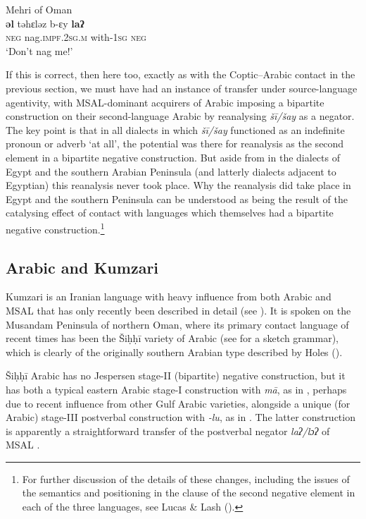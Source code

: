\documentclass[output=paper]{langsci/langscibook}
\begin{document}
\ea\label{ex:key:meh1}
{       Mehri of Oman \citep[23]{Johnstone1987}}\\
\gll \textbf{əl} təhɛləz b-ɛy \textbf{laʔ}\\
     \textsc{neg} nag.\textsc{impf.2sg.m} with-\textsc{1sg} \textsc{neg} \\
\glt ‘Don’t nag me!’
\z

If this is correct, then here too, exactly as with the Coptic–Arabic contact in the previous section, we must have had an instance of transfer under source-language agentivity, with MSAL-dominant acquirers of Arabic imposing a bipartite construction on their second-language Arabic by reanalysing \textit{šī/šay} as a negator. The key point is that in all dialects in which \textit{šī/šay} functioned as an indefinite pronoun or adverb ‘at all’, the potential was there for reanalysis as the second element in a bipartite negative construction. But aside from in the dialects of Egypt and the southern Arabian Peninsula (and latterly dialects adjacent to Egyptian) this reanalysis never took place. Why the reanalysis did take place in Egypt and the southern Peninsula can be understood as being the result of the catalysing effect of contact with languages which themselves had a bipartite negative construction.\footnote{For further discussion of the details of these changes, including the issues of the semantics and positioning in the clause of the second negative element in each of the three languages, see Lucas \& Lash (\citeyear[395–401]{LucasLash2010}).}



\subsection{Arabic and Kumzari}\label{sec:key:kumz}


Kumzari is an Iranian language with heavy influence from both Arabic and MSAL that has only recently been described in detail (see \citealt{WalAnonbyforthcoming}). It is spoken on the Musandam Peninsula of northern Oman, where its primary contact language of recent times has been the Šiḥḥī variety of Arabic (see \citealt{Bernabela2011} for a sketch grammar), which is clearly of the originally southern Arabian type described by Holes (\citeyear[18–32]{Holes2016}).

Šiḥḥī Arabic has no Jespersen stage-II (bipartite) negative construction, but it has both a typical eastern Arabic stage-I construction with \textit{mā}, as in , perhaps due to recent influence from other Gulf Arabic varieties, alongside a unique (for Arabic) stage-III postverbal construction with \textit{{}-lu}, as in . The latter construction is apparently a straightforward transfer of the postverbal negator \textit{laʔ/lɔʔ} of MSAL . 
\end{document}
